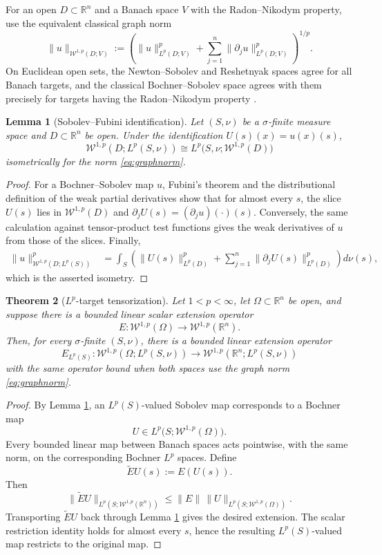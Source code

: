 \documentclass[11pt]{article}
\newtheorem{theorem}{Theorem}[section]
\newtheorem{lemma}[theorem]{Lemma}
\theoremstyle{remark}
\newcommand{\R}{\mathbb{R}}
\newcommand{\Om}{\Omega}
\newcommand{\Lp}{L^p}
\newcommand{\Wgraph}{\mathcal{W}^{1,p}}
\begin{document}
For an open $D\subset\R^n$ and a Banach space $V$ with the Radon--Nikodym
property, use the equivalent classical graph norm
\begin{equation}
\label{eq:graphnorm}
  \|u\|_{\Wgraph(D;V)}
  :=\left(
       \|u\|_{\Lp(D;V)}^p+
       \sum_{j=1}^n\|\partial_j u\|_{\Lp(D;V)}^p
     \right)^{1/p}.
\end{equation}
On Euclidean open sets, the Newton--Sobolev and Reshetnyak spaces agree for
all Banach targets, and the classical Bochner--Sobolev space agrees with
them precisely for targets having the Radon--Nikodym property
\cite{CaamanoEtAl}.

\begin{lemma}[Sobolev--Fubini identification]
\label{lem:fubini}
Let $(S,\nu)$ be a $\sigma$-finite measure space and $D\subset\R^n$ be open.
Under the identification $U(s)(x)=u(x)(s)$,
\[
  \Wgraph(D;L^p(S,\nu))
  \cong L^p\bigl(S,\nu;\Wgraph(D)\bigr)
\]
isometrically for the norm \eqref{eq:graphnorm}.
\end{lemma}

\begin{proof}
For a Bochner--Sobolev map $u$, Fubini's theorem and the distributional
definition of the weak partial derivatives show that for almost every
$s$, the slice $U(s)$ lies in $\Wgraph(D)$ and
$\partial_j U(s)=(\partial_j u)(\cdot)(s)$.  Conversely, the same
calculation against tensor-product test functions gives the weak derivatives
of $u$ from those of the slices.  Finally,
\[
 \begin{split}
  \|u\|_{\Wgraph(D;L^p(S))}^p
  &=\int_S\left(
       \|U(s)\|_{L^p(D)}^p+
       \sum_{j=1}^n\|\partial_jU(s)\|_{L^p(D)}^p
     \right)d\nu(s),
 \end{split}
\]
which is the asserted isometry.
\end{proof}

\begin{theorem}[$L^p$-target tensorization]
\label{thm:Lptarget}
Let $1<p<\infty$, let $\Om\subset\R^n$ be open, and suppose there is a
bounded linear scalar extension operator
\[
  E:\Wgraph(\Om)\longrightarrow \Wgraph(\R^n).
\]
Then, for every $\sigma$-finite $(S,\nu)$, there is a bounded linear extension
operator
\[
  E_{L^p(S)}:\Wgraph(\Om;L^p(S,\nu))
  \longrightarrow \Wgraph(\R^n;L^p(S,\nu))
\]
with the same operator bound when both spaces use the graph norm
\eqref{eq:graphnorm}.
\end{theorem}

\begin{proof}
By Lemma \ref{lem:fubini}, an $L^p(S)$-valued Sobolev map corresponds to a
Bochner map
\[
  U\in L^p\bigl(S;\Wgraph(\Om)\bigr).
\]
Every bounded linear map between Banach spaces acts pointwise, with the same
norm, on the corresponding Bochner $L^p$ spaces.  Define
\[
  \widetilde E U(s):=E(U(s)).
\]
Then
\[
  \|\widetilde E U\|_{L^p(S;\Wgraph(\R^n))}
  \le \|E\|\,
      \|U\|_{L^p(S;\Wgraph(\Om))}.
\]
Transporting $\widetilde E U$ back through Lemma \ref{lem:fubini} gives the
desired extension.  The scalar restriction identity holds for almost every
$s$, hence the resulting $L^p(S)$-valued map restricts to the original map.
\end{proof}
\end{document}
